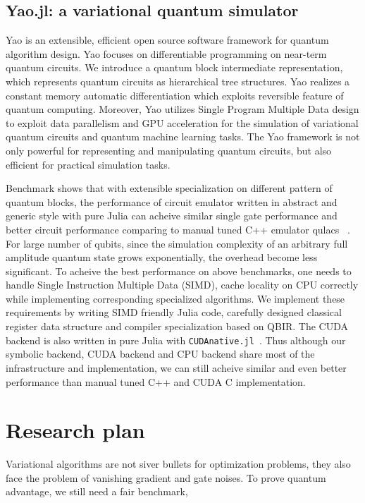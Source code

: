 \documentclass[]{article}
\begin{document}
\subsection{Yao.jl: a variational quantum simulator}
Yao is an extensible, efficient open source software framework for
quantum algorithm design. Yao focuses on differentiable programming on near-term quantum circuits. 
We introduce a quantum block intermediate representation, which represents quantum circuits as hierarchical tree structures. 
Yao realizes a constant memory automatic differentiation which exploits reversible feature of quantum computing. 
Moreover, Yao utilizes Single Program Multiple Data design to exploit data parallelism and GPU acceleration for the simulation of variational quantum circuits and quantum machine learning tasks. 
The Yao framework is not only powerful for representing and manipulating quantum
circuits, but also efficient for practical simulation tasks. 

Benchmark shows that with extensible specialization on different pattern of quantum blocks, the performance of
circuit emulator written in abstract and generic style with pure Julia can acheive similar single gate performance and
better circuit performance comparing to manual tuned C++ emulator qulacs~\cite{qulacs2019variational} . For large number of qubits, since the
simulation complexity of an arbitrary full amplitude quantum state grows exponentially, the overhead become less significant.
To acheive the best performance on above benchmarks, one needs to handle Single Instruction
Multiple Data (SIMD), cache locality on CPU correctly while implementing corresponding specialized algorithms.
We implement these requirements by writing SIMD friendly Julia code, carefully designed classical register data structure and
compiler specialization based on QBIR. The CUDA backend is also written in pure Julia with \texttt{CUDAnative.jl}~\cite{besard2018effective}.
Thus although our symbolic backend, CUDA backend and CPU backend share most of the infrastructure and
implementation, we can still acheive similar and even better performance than manual tuned C++ and CUDA C implementation.


\section{Research plan}
Variational algorithms are not siver bullets for optimization problems, they also face the problem of vanishing gradient and gate noises.
To prove quantum advantage, we still need a fair benchmark,
\end{document}
